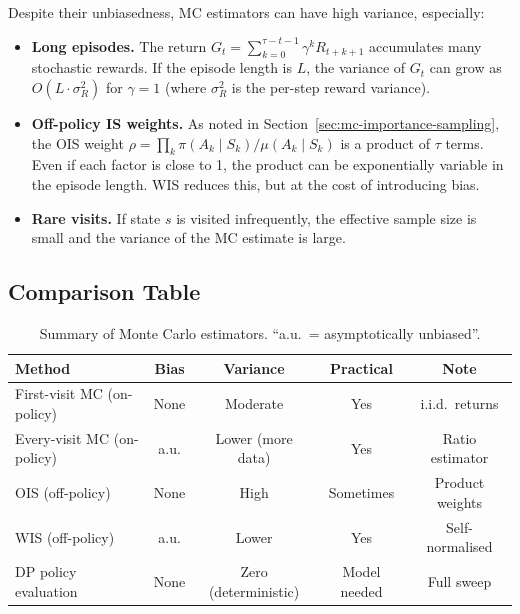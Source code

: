 Despite their unbiasedness, MC estimators can have high variance, especially:
\begin{itemize}[leftmargin=*]
  \item \textbf{Long episodes.}  The return $G_t = \sum_{k=0}^{\tau-t-1}\gamma^k R_{t+k+1}$ accumulates many stochastic rewards.  If the episode length is $L$, the variance of $G_t$ can grow as $O(L \cdot \sigma_R^2)$ for $\gamma = 1$ (where $\sigma_R^2$ is the per-step reward variance).

  \item \textbf{Off-policy IS weights.}  As noted in Section~\ref{sec:mc-importance-sampling}, the OIS weight $\rho = \prod_{k} \pi(A_k \mid S_k)/\mu(A_k \mid S_k)$ is a product of $\tau$ terms.  Even if each factor is close to 1, the product can be exponentially variable in the episode length.  WIS reduces this, but at the cost of introducing bias.

  \item \textbf{Rare visits.}  If state $s$ is visited infrequently, the effective sample size is small and the variance of the MC estimate is large.
\end{itemize}

\subsection*{Comparison Table}

\begin{table}[ht]
\centering
\caption{Summary of Monte Carlo estimators.  ``a.u.\ = asymptotically unbiased''.}
\label{tab:mc-comparison}
\begin{tabular}{@{}lcccc@{}}
\toprule
Method & Bias & Variance & Practical & Note \\
\midrule
First-visit MC (on-policy)  & None     & Moderate      & Yes  & i.i.d.\ returns \\
Every-visit MC (on-policy)  & a.u.     & Lower (more data) & Yes  & Ratio estimator \\
OIS (off-policy)            & None     & High          & Sometimes & Product weights \\
WIS (off-policy)            & a.u.     & Lower         & Yes  & Self-normalised \\
DP policy evaluation        & None     & Zero (deterministic) & Model needed & Full sweep \\
\bottomrule
\end{tabular}
\end{table}

